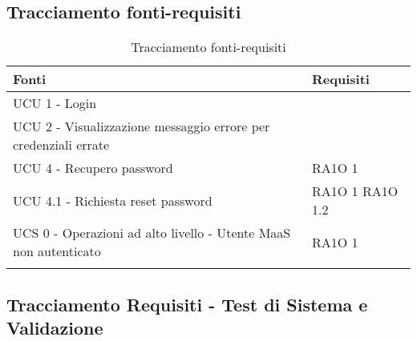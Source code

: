 \subsection{Tracciamento fonti-requisiti}
			\begin{center}
			\bgroup
			\def\arraystretch{1.8}
			\begin{longtable}{ | p{5cm} | p{5cm} |}
		
			\cellcolor[gray]{0.9} \textbf{Fonti} & \cellcolor[gray]{0.9} \textbf{Requisiti} \\ \hline       
						UCU 1 - Login &  \\ \hline      
						UCU 2 - Visualizzazione messaggio errore per credenziali errate &  \\ \hline      
						UCU 4 - Recupero password &  RA1O 1 \newline  \\ \hline      
						UCU 4.1 - Richiesta reset password &  RA1O 1 \newline  RA1O 1.2 \newline  \\ \hline      
						UCS 0 - Operazioni ad alto livello - Utente MaaS non autenticato &  RA1O 1 \newline  \\ \hline  
			\caption{Tracciamento fonti-requisiti}   
			\end{longtable}
			\egroup
			\end{center}  
\clearpage
\subsection{Tracciamento Requisiti - Test di Sistema e Validazione}

